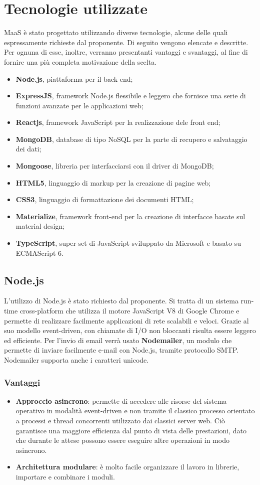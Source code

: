 \section{Tecnologie utilizzate}
MaaS \`e stato progettato utilizzando diverse tecnologie, alcune delle quali espressamente richieste dal proponente. Di seguito vengono elencate e descritte. Per ognuna di esse, inoltre, verranno presentanti vantaggi e svantaggi, al fine di fornire una pi\`u completa motivazione della scelta.
\begin{itemize}
\item \textbf{Node.js}, piattaforma per il back end;
\item \textbf{ExpressJS}, framework Node.js flessibile e leggero che fornisce una serie di funzioni avanzate per le applicazioni web;
\item \textbf{Reactjs}, framework JavaScript per la realizzazione dele front end;
\item \textbf{MongoDB}, database di tipo NoSQL per la parte di recupero e salvataggio dei dati;
\item \textbf{Mongoose}, libreria per interfacciarsi con il driver di MongoDB;
\item \textbf{HTML5}, linguaggio di markup per la creazione di pagine web;
\item \textbf{CSS3}, linguaggio di formattazione dei documenti HTML;
\item \textbf{Materialize}, framework front-end per la creazione di interfacce basate sul material design;
\item \textbf{TypeScript}, super-set di JavaScript sviluppato da Microsoft e basato su ECMAScript 6.
\end{itemize}
\subsection{Node.js}
L'utilizzo di Node.js \`e stato richiesto dal proponente. Si tratta di un sistema run-time cross-platform che utilizza il motore JavaScript V8 di Google Chrome e permette di realizzare facilmente applicazioni di rete scalabili e veloci. Grazie al suo modello event-driven, con chiamate di I/O non bloccanti risulta essere leggero ed efficiente. Per l'invio di email verrà usato \textbf{Nodemailer}, un modulo che permette di inviare facilmente e-mail con Node.js, tramite protocollo SMTP. Nodemailer supporta anche i caratteri unicode.
\subsubsection{Vantaggi}
\begin{itemize}
\item \textbf{Approccio asincrono}: permette di accedere alle risorse del sistema operativo in modalit\`a event-driven e non tramite il classico processo orientato a processi e thread concorrenti utilizzato dai classici server web. Ci\`o garantisce una maggiore efficienza dal punto di vista delle prestazioni, dato che durante le attese possono essere eseguire altre operazioni in modo asincrono.
\item \textbf{Architettura modulare}: \`e molto facile organizzare il lavoro in librerie, importare e combinare i moduli.
\end{itemize}
